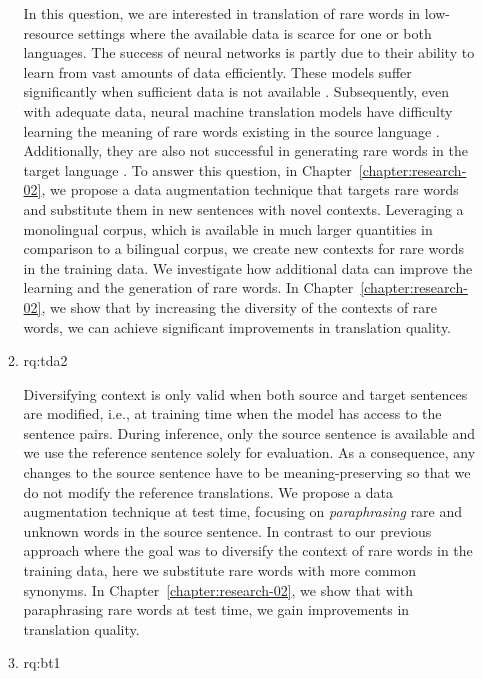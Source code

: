 \begin{enumerate}[label=\textbf{Research Question \arabic*:},ref={RQ\arabic*},wide = 0pt,resume]
\begin{enumerate}[label=\textbf{RQ2.\arabic*},wide = 0pt, leftmargin=2em]
In this question, we are interested in translation of rare words in low-resource settings where the available data is scarce for one or both languages. 
The success of neural networks is partly due to their ability to learn from vast amounts of data efficiently. 
These models suffer significantly when sufficient data is not available \citep{ngo-etal-2019-overcoming}.
Subsequently, even with adequate data, neural machine translation models have difficulty learning the meaning of rare words existing in the source language \citep{koehn2017six}. 
Additionally, they are also not successful in generating rare words in the target language \citep{luong2014addressing}.  
To answer this question, in Chapter~\ref{chapter:research-02}, we propose a data augmentation technique that targets rare words and substitute them in new sentences with novel contexts. 
Leveraging a monolingual corpus, which is available in much larger quantities in comparison to a bilingual corpus, we create new contexts for rare words in the training data.
We investigate how additional data can improve the learning and the generation of rare words. 
In Chapter~\ref{chapter:research-02}, we show that by increasing the diversity of the contexts of rare words, we can achieve significant improvements in translation quality.

\item \acl{rq:tda2} \label{rq:tda2}

\medskip

Diversifying context is only valid when both source and target sentences are modified, i.e., at training time when the model has access to the sentence pairs.
During inference, only the source sentence is available and we use the reference sentence solely for evaluation. 
As a consequence, any changes to the source sentence have to be meaning-preserving so that we do not modify the reference translations.
We propose a data augmentation technique at test time, focusing on \textit{paraphrasing} rare and unknown words in the source sentence. 
In contrast to our previous approach where the goal was to diversify the context of rare words in the training data, here we substitute rare words with more common synonyms.
In Chapter~\ref{chapter:research-02}, we show that with paraphrasing rare words at test time, we gain improvements in translation quality. 


\item \acl{rq:bt1} \label{rq:bt1}

\medskip


\end{enumerate}
\end{enumerate}
